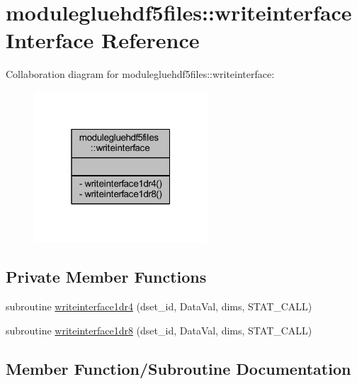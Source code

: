 \hypertarget{interfacemodulegluehdf5files_1_1writeinterface}{}\section{modulegluehdf5files\+:\+:writeinterface Interface Reference}
\label{interfacemodulegluehdf5files_1_1writeinterface}


Collaboration diagram for modulegluehdf5files\+:\+:writeinterface\+:\nopagebreak
\begin{figure}[H]
\begin{center}
\leavevmode
\includegraphics[width=184pt]{interfacemodulegluehdf5files_1_1writeinterface__coll__graph}
\end{center}
\end{figure}
\subsection*{Private Member Functions}
\begin{DoxyCompactItemize}
\item 
subroutine \mbox{\hyperlink{interfacemodulegluehdf5files_1_1writeinterface_af5a4bbff1dc32898273a563a923a7cca}{writeinterface1dr4}} (dset\+\_\+id, Data\+Val, dims, S\+T\+A\+T\+\_\+\+C\+A\+LL)
\item 
subroutine \mbox{\hyperlink{interfacemodulegluehdf5files_1_1writeinterface_a6790993ebedbaf8a83ce1cf1fc896e0a}{writeinterface1dr8}} (dset\+\_\+id, Data\+Val, dims, S\+T\+A\+T\+\_\+\+C\+A\+LL)
\end{DoxyCompactItemize}


\subsection{Member Function/\+Subroutine Documentation}
\mbox{\label{interfacemodulegluehdf5files_1_1writeinterface_af5a4bbff1dc32898273a563a923a7cca}} 
